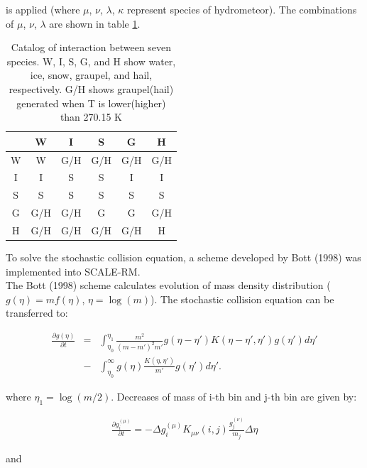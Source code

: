 is applied (where $\mu$, $\nu$, $\lambda$, $\kappa$ represent species of hydrometeor). The combinations of $\mu$, $\nu$, $\lambda$ are shown in table \ref{table-s10-1}.

\begin{table}[h]
\begin{center}
\caption{Catalog of interaction between seven species. W, I, S, G, and H show water, ice, snow, graupel, and hail, respectively. G/H shows graupel(hail) generated when T is lower(higher) than 270.15 K}
\label{table-s10-1}
\begin{tabular}{cccccc}
\hline
     & W   & I   & S   & G   & H   \\ \hline\hline
W    & W   & G/H & G/H & G/H & G/H \\ \hline
I    & I   & S   & S   & I   & I   \\ \hline
S    & S   & S   & S   & S   & S   \\ \hline
G    & G/H & G/H & G   & G   & G/H \\ \hline
H    & G/H & G/H & G/H & G/H & H   \\ \hline
\end{tabular}
\end{center}
\end{table}


To solve the stochastic collision equation, a scheme developed by Bott (1998)\cite{bott_1998} was implemented into SCALE-RM.\\
The Bott (1998)\cite{bott_1998} scheme calculates evolution of mass density distribution ($g(\eta)=mf(\eta)$, $\eta=\log(m)$). The stochastic collision equation can be transferred to:

\begin{eqnarray}
\frac{\partial g(\eta)}{\partial t}&=&\int_{\eta_{0}}^{\eta_{1}}\frac{m^{2}}{(m-m')^{2} m'}g(\eta-\eta') K(\eta-\eta',\eta')g(\eta')d\eta' \nonumber\\
&-&\int_{\eta_{0}}^{\infty} g(\eta)\frac{K(\eta,\eta')}{m'}g(\eta')d\eta'.\label{s10-17}
\end{eqnarray}

 where $\eta_{1}=\log(m/2)$. Decreases of mass of i-th bin and j-th bin are given by:

\begin{eqnarray}
\frac{\partial g_{i}^{(\mu)}}{\partial t}=-\Delta g^{(\mu)}_{i} K_{\mu\nu}(i,j)\frac{g_{j}^{(\nu)}}{m_{j}}\Delta \eta\label{s10-18}
\end{eqnarray}

and


